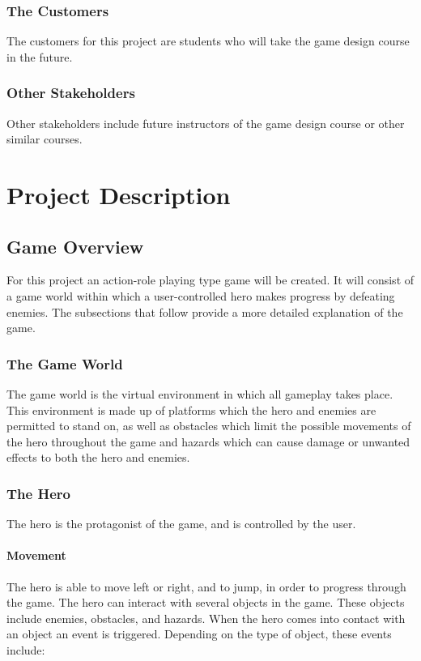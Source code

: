 \documentclass[12pt, titlepage]{article}
\begin{document}
\subsubsection{The Customers}
The customers for this project are students who will take the game design course in the future.
\subsubsection{Other Stakeholders}
Other stakeholders include future instructors of the game design course or other similar courses.

\newpage
\section{Project Description}
\subsection{Game Overview}
For this project an action-role playing type game will be created.  It will consist of a game world within which a user-controlled hero makes progress by defeating enemies.  The subsections that follow provide a more detailed explanation of the game.

\subsubsection{The Game World}
The game world is the virtual environment in which all gameplay takes place.  This environment is made up of platforms which the hero and enemies are permitted to stand on, as well as obstacles which limit the possible movements of the hero throughout the game and hazards which can cause damage or unwanted effects to both the hero and enemies.


\subsubsection{The Hero}
The hero is the protagonist of the game, and is controlled by the user.

\paragraph{Movement}
The hero is able to move left or right, and to jump, in order to progress through the game.  The hero can interact with several objects in the game.  These objects include enemies, obstacles, and hazards.  When the hero comes into contact with an object an event is triggered.  Depending on the type of object, these events include:
\end{document}

